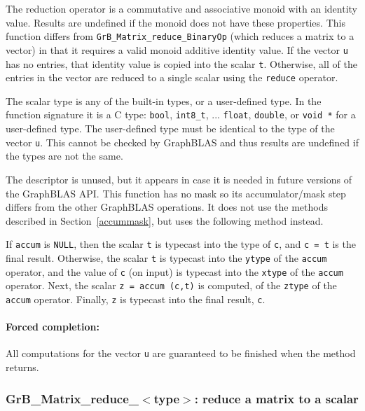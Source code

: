 \documentclass[12pt]{article}
\begin{document}
The reduction operator is a commutative and associative monoid with an identity
value.  Results are undefined if the monoid does not have these properties.
This function differs from \verb'GrB_Matrix_reduce_BinaryOp' (which reduces
a matrix to a vector) in that it requires a
valid monoid additive identity value.  If the vector \verb'u' has no entries,
that identity value is copied into the scalar \verb't'.  Otherwise, all of the
entries in the vector are reduced to a single scalar using the \verb'reduce'
operator.

The scalar type is any of the built-in types, or a user-defined type.  In the
function signature it is a C type: \verb'bool', \verb'int8_t', ...
\verb'float', \verb'double', or \verb'void *' for a user-defined type.
The user-defined type must be identical to the type of the vector \verb'u'.
This cannot be checked by GraphBLAS and thus results are undefined if the
types are not the same.

The descriptor is unused, but it appears in case it is needed in future
versions of the GraphBLAS API.
This function has no mask so its accumulator/mask step differs from the other
GraphBLAS operations.  It does not use the methods described in
Section~\ref{accummask}, but uses the following method instead.

If \verb'accum' is \verb'NULL', then the scalar \verb't' is typecast into the
type of \verb'c', and \verb'c = t' is the final result.  Otherwise, the scalar
\verb't' is typecast into the \verb'ytype' of the \verb'accum' operator, and
the value of \verb'c' (on input) is typecast into the \verb'xtype' of the
\verb'accum' operator.  Next, the scalar \verb'z = accum (c,t)' is computed, of
the \verb'ztype' of the \verb'accum' operator.  Finally, \verb'z' is typecast
into the final result, \verb'c'.

\paragraph{Forced completion:}
All computations for the vector \verb'u' are
guaranteed to be finished when the method returns.

\newpage
\subsubsection{{\sf GrB\_Matrix\_reduce\_$<$type$>$:} reduce a matrix to a scalar}
\label{reduce_matrix_to_scalar}
\end{document}

